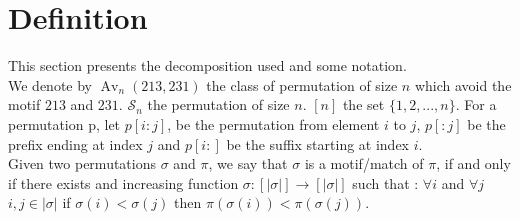 \documentclass[a4paper]{llncs}
\DeclareMathOperator{\Avd}{Av}
\newcommand\Av[2]{\Avd_{{#1}}({#2})}
\newcommand{\Perm}[1]{\mathcal{S}_{#1}}
\newcommand{\ptext}{\pi}
\newcommand{\pmotif}{\sigma}
\begin{document}
	
%	 
%
%	
	

	
	

	
	\section{Definition}

		This section presents the decomposition used and some notation.\\	
		
		We denote by $\Av{n}{213,231}$ the class
		of permutation of size $n$ which avoid 
		the motif $213$ and $231$. 
		$\Perm{n}$ the permutation of size $n$.
		$[n]$ the set $\{1,2,...,n\}.$
		For a permutation p, let $p[i:j]$, 
		be the permutation from element $i$ to $j$,
		$p[:j]$ be the prefix ending at index $j$
		and $p[i:]$ be the suffix starting at index $i$.\\
		
		Given two permutations
		$\pmotif$ and $\ptext$,
		we say that $\pmotif$
		is a motif/match of
		$\ptext$,
		if and only if
		there exists 
		and increasing function 
		$\sigma:[|\pmotif|] \rightarrow [|\pmotif|]$
		such that : $\forall i$ and 
		$\forall j$ $i,j \in |\pmotif| $
		if $\pmotif(i)<\pmotif(j)$
		then $\ptext(\sigma(i))<\ptext(\sigma(j))$.\\
		
\end{document}
